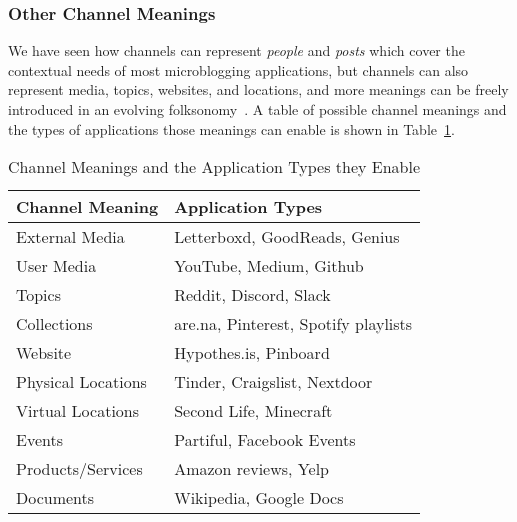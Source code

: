 

\subsubsection{Other Channel Meanings}

We have seen how channels can represent \emph{people} and \emph{posts}
which cover the contextual needs of most microblogging applications,
but channels can also represent media, topics, websites, and locations,
and more meanings can be freely introduced in an evolving folksonomy~\cite{folksonomy}.
A table of possible channel meanings and the types of applications
those meanings can enable is shown in Table~\ref{concepts:channels-and-applications}.


\begin{table}[h]
\small
\caption{Channel Meanings and the Application Types they Enable}
\label{concepts:channels-and-applications}
\centering
\begin{tabular}{|l|l|}
\hline
\textbf{Channel Meaning} & \textbf{Application Types} \\ \hline
External Media & Letterboxd, GoodReads, Genius \\ \hline
User Media & YouTube, Medium, Github \\ \hline
Topics & Reddit, Discord, Slack \\ \hline
Collections & are.na, Pinterest, Spotify playlists \\ \hline
Website & Hypothes.is, Pinboard \\ \hline
Physical Locations & Tinder, Craigslist, Nextdoor \\ \hline
Virtual Locations & Second Life, Minecraft \\ \hline
Events & Partiful, Facebook Events \\ \hline
Products/Services & Amazon reviews, Yelp \\ \hline
Documents & Wikipedia, Google Docs \\ \hline
\end{tabular}
\end{table}

